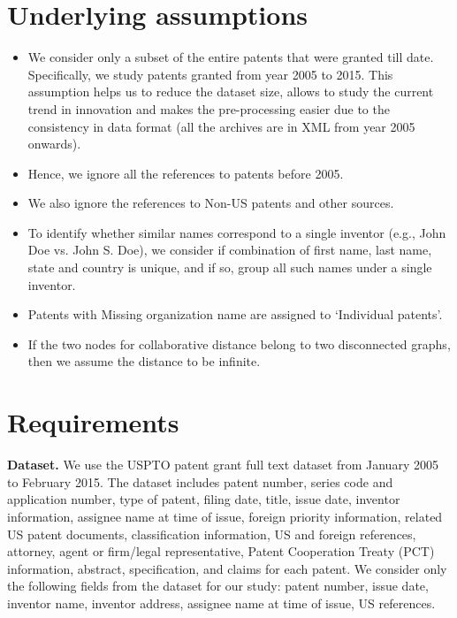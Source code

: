 \documentclass[11pt]{article}
\renewcommand{\paragraph}{\vspace{3pt}\noindent\textbf}
\begin{document}
\section{Underlying assumptions} %
\begin{itemize}
\item We consider only a subset of the entire patents that were granted till date. Specifically, we study patents granted from year 2005 to 2015. This assumption helps us to reduce the dataset size, allows to study the current trend in innovation and makes the pre-processing easier due to the consistency in data format (all the archives are in XML from year 2005 onwards).
\item Hence, we ignore all the references to patents before 2005. 
\item We also ignore the references to Non-US patents and other sources.
\item To identify whether similar names correspond to a single inventor (e.g., John Doe vs. John S. Doe), we consider if combination of first name, last name, state and country is unique, and if so, group all such names under a single inventor.
\item Patents with Missing organization name  are assigned to ‘Individual patents’.
\item If the two nodes for collaborative distance belong to two disconnected graphs, then we assume the distance to be infinite.
\end{itemize}


\section{Requirements}

\paragraph {Dataset.} 
We use the USPTO patent grant full text dataset from January 2005 to February 2015. 
The dataset includes patent number, series code and application number, type of patent, filing date, title, issue date, inventor information, assignee name at time of issue, foreign priority information, related US patent documents, classification information, US and foreign references, attorney, agent or firm/legal representative, Patent Cooperation Treaty (PCT) information, abstract, specification, and claims for each patent. We consider only the following fields from the dataset for our study: patent number, issue date, inventor name, inventor address, assignee name at time of issue, US references.
\end{document}
